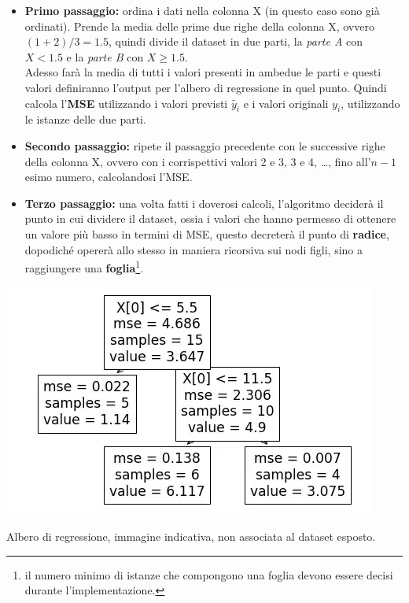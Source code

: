 \documentclass[a4paper, 11pt, oneside]{report}
\begin{document}
                \begin{itemize}
                    \item \textbf{Primo passaggio:} ordina i dati nella colonna X (in questo caso sono già ordinati).
                    Prende la media delle prime due righe della colonna X, ovvero $(1+2)/3 = 1.5$, quindi divide il dataset
                    in due parti, la \textit{parte A} con $X < 1.5$ e la \textit{parte B} con $X \geq 1.5$.
                    \\Adesso farà la media di tutti i valori presenti in ambedue le parti e questi valori
                    definiranno l'output per l'albero di regressione in quel punto. Quindi calcola l'\textbf{MSE}
                    utilizzando i valori previsti $\tilde{y_i}$ e i valori originali $y_i$, utilizzando le istanze
                    delle due parti.
                    \item \textbf{Secondo passaggio:} ripete il passaggio precedente con le successive righe della colonna
                    X, ovvero con i corrispettivi valori 2 e 3, 3 e 4, \ldots, fino all'$n-1$esimo numero, calcolandosi
                    l'MSE.
                    \item \textbf{Terzo passaggio:} una volta fatti i doverosi calcoli, l'algoritmo deciderà il punto in cui
                    dividere il dataset, ossia i valori che hanno permesso di ottenere un valore più basso in termini di MSE, questo decreterà
                    il punto di \textbf{radice}, dopodiché opererà allo stesso in maniera ricorsiva sui nodi figli, sino a raggiungere
                    una \textbf{foglia}\footnote{il numero minimo di istanze che compongono una foglia devono essere decisi durante
                    l'implementazione.}.
                \end{itemize}
                \medskip
                \begin{center}
                    \hspace*{5em}\includegraphics[scale=0.7]{albero}
                    \par \noindet Albero di regressione, immagine indicativa, non associata al dataset esposto.
                \end{center}
\end{document}

